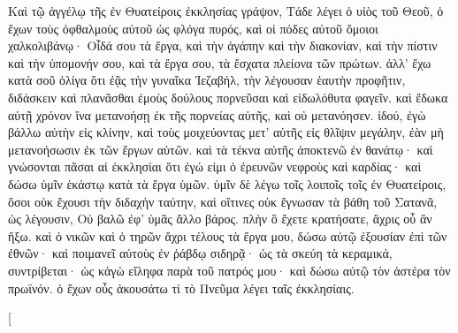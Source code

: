 \begin{pages}
\begin{Leftside}
		\pend
		\pstart
			Καὶ τῷ ἀγγέλῳ τῆς ἐν Θυατείροις ἐκκλησίας γράψον, Τάδε λέγει ὁ υἱὸς τοῦ Θεοῦ, ὁ ἔχων τοὺς ὀφθαλμοὺς αὐτοῦ ὡς φλόγα πυρός, καὶ οἱ πόδες αὐτοῦ ὅμοιοι χαλκολιβάνῳ· Οἶδά σου τὰ ἔργα, καὶ τὴν ἀγάπην καὶ τὴν διακονίαν, καὶ τὴν πίστιν καὶ τὴν ὑπομονήν σου, καὶ τὰ ἔργα σου, τὰ ἔσχατα πλείονα τῶν πρώτων. 
		\pend
		\pstart
			ἀλλ’ ἔχω κατὰ σοῦ ὀλίγα ὅτι ἐᾷς τὴν γυναῖκα Ἰεζαβήλ, τὴν λέγουσαν ἑαυτὴν προφῆτιν, διδάσκειν καὶ πλανᾶσθαι ἐμοὺς δούλους πορνεῦσαι καὶ εἰδωλόθυτα φαγεῖν. καὶ ἔδωκα αὐτῇ χρόνον ἵνα μετανοήσῃ ἐκ τῆς πορνείας αὐτῆς, καὶ οὐ μετανόησεν. 
		\pend
		\pstart	
			ἰδού, ἐγὼ βάλλω αὐτὴν εἰς κλίνην, καὶ τοὺς μοιχεύοντας μετ’ αὐτῆς εἰς θλῖψιν μεγάλην, ἐὰν μὴ μετανοήσωσιν ἐκ τῶν ἔργων αὐτῶν. καὶ τὰ τέκνα αὐτῆς ἀποκτενῶ ἐν θανάτῳ· καὶ γνώσονται πᾶσαι αἱ ἐκκλησίαι ὅτι ἐγώ εἰμι ὁ ἐρευνῶν νεφροὺς καὶ καρδίας· καὶ δώσω ὑμῖν ἑκάστῳ κατὰ τὰ ἔργα ὑμῶν. ὑμῖν δὲ λέγω τοῖς λοιποῖς τοῖς ἐν Θυατείροις, ὅσοι οὐκ ἔχουσι τὴν διδαχὴν ταύτην, καὶ οἵτινες οὐκ ἔγνωσαν τὰ βάθη τοῦ Σατανᾶ, ὡς λέγουσιν, Οὐ βαλῶ ἐφ’ ὑμᾶς ἄλλο βάρος. πλὴν ὃ ἔχετε κρατήσατε, ἄχρις οὗ ἂν ἥξω. καὶ ὁ νικῶν καὶ ὁ τηρῶν ἄχρι τέλους τὰ ἔργα μου, δώσω αὐτῷ ἐξουσίαν ἐπὶ τῶν ἐθνῶν· καὶ ποιμανεῖ αὐτοὺς ἐν ῥάβδῳ σιδηρᾷ· ὡς τὰ σκεύη τὰ κεραμικά, συντρίβεται· ὡς κἀγὼ εἴληφα παρὰ τοῦ πατρός μου· καὶ δώσω αὐτῷ τὸν ἀστέρα τὸν πρωϊνόν. ὁ ἔχων οὖς ἀκουσάτω τί τὸ Πνεῦμα λέγει ταῖς ἐκκλησίαις.
			\pend
        \endnumbering
    \end{Leftside}
    \begin{Rightside}
        \beginnumbering
        \pstart[

\end{Rightside}
\end{pages}
